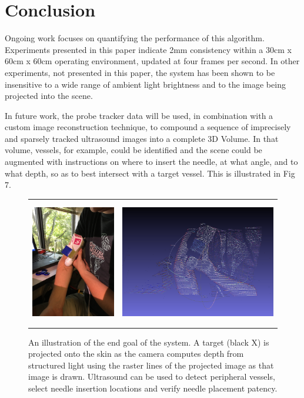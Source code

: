 \documentclass{llncs}
\begin{document}
\section{Conclusion}
Ongoing work focuses on quantifying the performance of this algorithm.  Experiments presented in this paper indicate 2mm consistency within a 30cm x 60cm x 60cm operating environment, updated at four frames per second.  In other experiments, not presented in this paper, the system has been shown to be insensitive to a wide range of ambient light brightness and to the image being projected into the scene.

In future work, the probe tracker data will be used, in combination with a custom image reconstruction technique, to compound a sequence of imprecisely and sparsely tracked ultrasound images into a complete 3D Volume.  In that volume, vessels, for example, could be identified and the scene could be augmented with instructions on where to insert the needle, at what angle, and to what depth, so as to best intersect with a target vessel.  This is illustrated in Fig 7.

\begin{figure}
\centering
\begin{tabular}{cc}
\centering
\includegraphics[height=5.5cm,keepaspectratio]{Hastings_arm} &
\includegraphics[height=5.5cm,keepaspectratio]{Hastings_arm_pointcloud}\\
\end{tabular}
\caption{An illustration of the end goal of the system. A target (black X) is projected onto the skin as the camera computes depth from structured light using the raster lines of the projected image as that image is drawn. Ultrasound can be used to detect peripheral vessels, select needle insertion locations and verify needle placement patency.
}
\end{figure}
\end{document}

